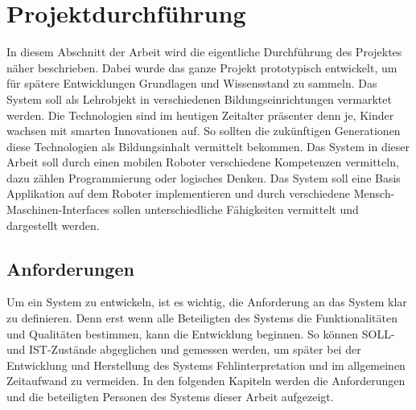 \chapter{Projektdurchführung}
In diesem Abschnitt der Arbeit wird die eigentliche Durchführung des Projektes näher beschrieben. Dabei wurde das ganze Projekt prototypisch entwickelt, um für spätere Entwicklungen Grundlagen und Wissensstand zu sammeln. Das System soll als Lehrobjekt in verschiedenen Bildungseinrichtungen vermarktet werden. Die Technologien sind im heutigen Zeitalter präsenter denn je, Kinder wachsen mit smarten Innovationen auf. So sollten die zukünftigen Generationen diese Technologien als Bildungsinhalt vermittelt bekommen. Das System in dieser Arbeit soll durch einen mobilen Roboter verschiedene Kompetenzen vermitteln, dazu zählen Programmierung oder logisches Denken. Das System soll eine Basis Applikation auf dem Roboter implementieren und durch verschiedene Mensch-Maschinen-Interfaces sollen unterschiedliche Fähigkeiten vermittelt und dargestellt werden.\cite{RoboterInDerBildung.2021}
\section{Anforderungen}
Um ein System zu entwickeln, ist es wichtig, die Anforderung an das System klar zu definieren. Denn erst wenn alle Beteiligten des Systems die Funktionalitäten und Qualitäten bestimmen, kann die Entwicklung beginnen. So können SOLL- und IST-Zustände abgeglichen und gemessen werden, um später bei der Entwicklung und Herstellung des Systems Fehlinterpretation und im allgemeinen Zeitaufwand zu vermeiden. In den folgenden Kapiteln werden die Anforderungen und die beteiligten Personen des Systems dieser Arbeit aufgezeigt.\cite[S.5 ff]{Anforderungsmanagemet.2014}

